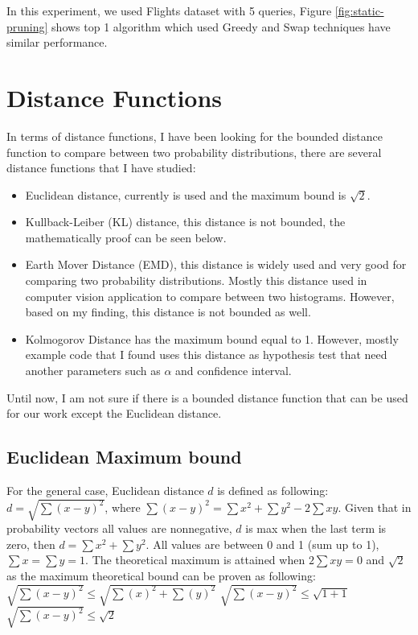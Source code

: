 \documentclass{article}
\begin{document}
In this experiment, we used Flights dataset with 5 queries, Figure \ref{fig:static-pruning} shows top 1 algorithm which used Greedy and Swap techniques have similar performance.




\section{Distance Functions}


In terms of distance functions, I have been looking for the bounded distance function to compare between two probability distributions, there are several distance functions that I have studied: 

\begin{itemize}
	\item Euclidean distance, currently is used and the maximum bound is $ \sqrt{2} $.
	\item Kullback-Leiber (KL) distance, this distance is not bounded, the mathematically proof can be seen below.
	\item Earth Mover Distance (EMD), this distance is widely used and very good for comparing two probability distributions. Mostly this distance used in computer vision application to compare between two histograms. However, based on my finding, this distance is not bounded as well.
	\item Kolmogorov Distance has the maximum bound equal to 1. However, mostly example code that I found uses this distance as hypothesis test that need another parameters such as $\alpha$ and confidence interval. 
\end{itemize}
Until now, I am not sure if there is a bounded distance function that can be used for our work except the Euclidean distance. 

\subsection{Euclidean Maximum bound}
For the general case, Euclidean distance $d$ is defined as following: 
$d = \sqrt{\sum{(x-y)^2}}$, where $ \sum{(x-y)^2} = \sum x^2 + \sum y^2 - 2\sum xy$. Given that in probability vectors all values are nonnegative, $d$ is max when the last term is zero, then $d = \sum x^2 + \sum y^2$. All values are between 0 and 1 (sum up to 1), $\sum x = \sum y = 1$. The theoretical maximum is attained when $2\sum xy = 0$ and $\sqrt{2}$ as the maximum theoretical bound can be proven as following: 
\newline
$ \sqrt{\sum{(x-y)^2}} \leq \sqrt{\sum{(x)^2} + \sum{(y)^2}} $
\newline
$ \sqrt{\sum{(x-y)^2}} \leq \sqrt{1 + 1} $
\newline
$ \sqrt{\sum{(x-y)^2}} \leq \sqrt{2} $
\end{document}
